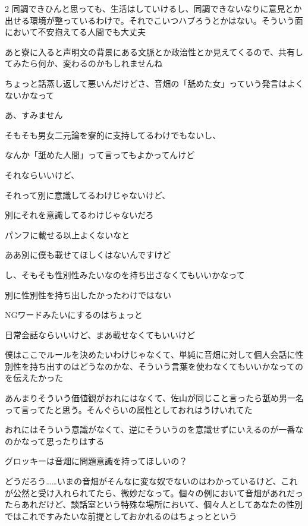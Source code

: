 \begin{multicols}{2}
 同調できひんと思っても、生活はしていけるし、同調できないなりに意見とか出せる環境が整っているわけで。それでこいつハブろうとかはない。そういう面において不安抱えてる人間でも大丈夫

 あと寮に入ると声明文の背景にある文脈とか政治性とか見えてくるので、共有してみたら何か、変わるのかもしれませんね


 ちょっと話蒸し返して悪いんだけどさ、音畑の「舐めた女」っていう発言はよくないかなって

 あ、すみません

 そもそも男女二元論を寮的に支持してるわけでもないし、

 なんか「舐めた人間」って言ってもよかってんけど

 それならいいけど、

 それって別に意識してるわけじゃないけど、

 別にそれを意識してるわけじゃないだろ

 パンフに載せる以上よくないなと

 ああ別に僕も載せてほしくはないんですけど

 し、そもそも性別性みたいなのを持ち出さなくてもいいかなって

 別に性別性を持ち出したかったわけではない

 NGワードみたいにするのはちょっと

 日常会話ならいいけど、まあ載せなくてもいいけど

 僕はここでルールを決めたいわけじゃなくて、単純に音畑に対して個人会話に性別性を持ち出すのはどうなのかな、そういう言葉を使わなくてもいいかなってのを伝えたかった

 あんまりそういう価値観がおれにはなくて、佐山が同じこと言ったら舐め男一名って言ってたと思う。そんぐらいの属性としておれはうけいれてた

 おれにはそういう意識がなくて、逆にそういうのを意識せずにいえるのが一番なのかなって思ったりはする

 グロッキーは音畑に問題意識を持ってほしいの？

 どうだろう……いまの音畑がそんなに変な奴でないのはわかっているけど、これが公然と受け入れられてたら、微妙だなって。個々の例において音畑があれだったらあれだけど、談話室という特殊な場所において、個々人としてあなたの性別ではこれですみたいな前提としておかれるのはちょっとという


\end{multicols}
